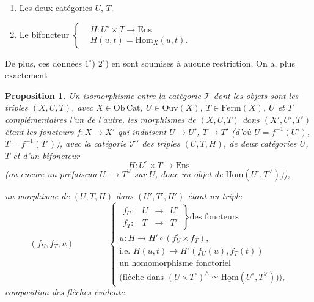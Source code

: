 \documentclass[11pt]{article}
\newcommand{\printedpage}[1]{\marginpar{\footnotesize p.~#1}}
\newcommand{\uHom}{\underline{\mathrm{Hom}}}
\begin{document}
\begin{enumerate}[label={}]
\item[$1^\circ$)] Les deux catégories $U$, $T$.
\item[$2^\circ$)] Le bifoncteur $\displaystyle\left\{\begin{aligned}
&H : U^\circ \times T \longrightarrow \mathrm{Ens}\\[1ex]
&H(u,t) = \mathrm{Hom}_X(u,t).
\end{aligned}\right.$
\end{enumerate}

De plus, ces données $1^\circ$) $2^\circ$) en sont soumises à aucune restriction. On a, plus exactement %

\textbf{Proposition 1.} \textit{Un isomorphisme} \textit{entre la catégorie $\mathcal{T}$ dont les objets sont les triples $(X,U,T)$, avec $X \in \mathrm{Ob}\,\mathrm{Cat}$, $U \in \mathrm{Ouv}(X)$, $T \in \mathrm{Ferm}(X)$, $U$ et $T$ complémentaires l'un de l'autre, les morphismes de $(X,U,T)$ dans $(X',U',T')$ étant les foncteurs $f : X \longrightarrow X'$ qui induisent $U \longrightarrow U'$, $T \longrightarrow T'$ (d'où
\printedpage{44}
$U = f^{-1}(U')$, $T = f^{-1}(T')$), avec la catégorie $\mathcal{T}'$ des triples $(U,T,H)$, de deux catégories $U$, $T$ et d'un bifoncteur}
\[
H : U^\circ \times T \longrightarrow \mathrm{Ens}
\]
\hspace*{2em}\textit{(ou encore un préfaiscau $U^\circ \longrightarrow T^\vee$ sur $U$, donc un objet de} $\uHom(U^\circ,T^\vee)$\textit{)),} %

\textit{un morphisme de $(U,T,H)$ dans $(U',T',H')$ étant un triple}
\[
(f_U, f_T, u) \qquad\qquad
\left\{\begin{array}{l}
\left.\begin{array}{llll}
f_U : & U & \longrightarrow & U' \\[1ex]
f_T : & T & \longrightarrow & T'
\end{array}\right\}\text{des foncteurs}\\[2ex]
u : H \longrightarrow H' \circ (f_U^\circ \times f_T),\\
\text{i.e. } H(u,t) \longrightarrow H'(f_U(u), f_T(t))\\
\text{un homomorphisme fonctoriel}\\
\text{(flèche dans } (U \times T^\circ)^\wedge \simeq \uHom(U^\circ,T^\vee)\text{)),}
\end{array}\right.
\]
\textit{composition des flèches évidente.}
\end{document}
